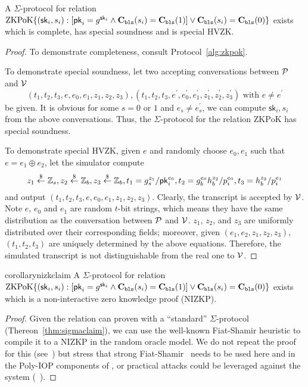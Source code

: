 \begin{theorem}
\label{thm:sigmaclaim}
A $\Sigma$-protocol for relation $\mathrm{ZKPoK}\{(\mathsf{sk}_i,s_i):[\mathsf{pk}_i=g^{\mathsf{sk}_i}\land{\textbf{C}_\texttt{bls}(s_i)}=\textbf{C}_\texttt{bls}(1)] \lor{\textbf{C}_\texttt{bls}(s_i)}=\textbf{C}_\texttt{bls}(0)\}$ exists which is complete, has special soundness and is special HVZK. 
\end{theorem}

\begin{proof}
To demonstrate completeness, consult Protocol~\ref{alg:zkpok}.

To demonstrate special soundness, let two accepting conversations between $\mathcal{P}$ and $\mathcal{V}$
$$
(t_1,t_2,t_3,e,e_0,e_1,z_1,z_2,z_3),(t_1,t_2,t_3,e^\prime,e_0^\prime,e_1^\prime,z_1^\prime,z_2^\prime,z_3^\prime)\text{ with $e\ne{e^\prime}$}
$$
be given. It is obvious for some $s=0$ or $1$ and $e_s\ne{e_s^\prime}$, we can compute $\mathsf{sk}_i,s_i$ from the above conversations. Thus, the $\Sigma$-protocol for the relation $\mathrm{ZKPoK}$ has special soundness.

To demonstrate special HVZK, given $e$ and randomly choose $e_0,e_1$ such that $e=e_1\oplus{e_2}$, let the simulator compute
$$
z_1\stackrel{\$}{\leftarrow}\mathbb{Z}_s,z_2\stackrel{\$}{\leftarrow}\mathbb{Z}_b,z_3\stackrel{\$}{\leftarrow}\mathbb{Z}_b,t_1=g_s^{z_1}/\mathsf{pk}_i^{e_0},t_2=g_b^{e_0}h_b^{z_2}/{p_i^{e_0}},t_3=h_b^{z_3}/{p_i^{e_1}}
$$
and output $(t_1,t_2,t_3,e,e_0,e_1,z_1,z_2,z_3)$. Clearly, the transcript is accepted by $\mathcal{V}$. Note $e$, $e_0$ and $e_1$ are random $t$-bit strings, which means they have the same distribution as the conversation between $\mathcal{P}$ and $\mathcal{V}$. $z_1$, $z_2$, and $z_3$ are uniformly distributed over their corresponding fields; moreover, given $(e_1,e_2,z_1,z_2,z_3)$, $(t_1,t_2,t_3)$ are uniquely determined by the above equations. Therefore, the simulated transcript is not distinguishable from the real one to $\mathcal{V}$.
\end{proof}


\begin{restatable}{corollary}{nizkclaim}
\label{thm:nizkclaim}
A $\Sigma$-protocol for relation $\mathrm{ZKPoK} \{ (\mathsf{sk}_i,s_i) :  [\mathsf{pk}_i=g^{\mathsf{sk}_i} \land \textbf{C}_\texttt{bls}(s_i)=\textbf{C}_\texttt{bls}(1)  ] \lor \textbf{C}_\texttt{bls}(s_i)=\textbf{C}_\texttt{bls}(0) \}$ exists which is a non-interactive zero knowledge proof (NIZKP).
\end{restatable}
    
\begin{proof}
Given the relation can proven with a ``standard'' $\Sigma$-protocol (Thereon~\ref{thm:sigmaclaim}), we can use the well-known Fiat-Shamir heuristic to compile it to a NIZKP in the random oracle model. We do not repeat the proof for this (see~\cite{damgard10,sigma}) but stress that strong Fiat-Shamir~\cite{weakfs} needs to be used here and in the Poly-IOP components of \Sys, or practical attacks could be leveraged against the system (\cf~\cite{weakfsattacks}).
\end{proof}

